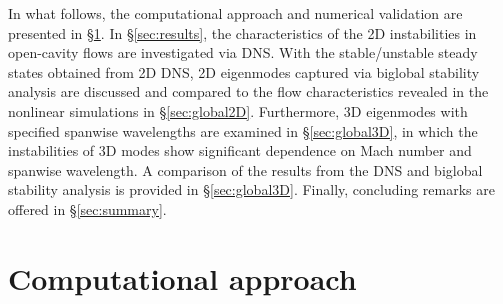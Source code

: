 \documentclass{jfm}
\begin{document}
In what follows, the computational approach and numerical validation are presented in \S{\ref{sec:approach}}. In \S{\ref{sec:results}}, the characteristics of the 2D instabilities in open-cavity flows are investigated via DNS. With the stable/unstable steady states obtained from 2D DNS, 2D eigenmodes captured via biglobal stability analysis are discussed and compared to the flow characteristics revealed in the nonlinear simulations in \S{\ref{sec:global2D}}. Furthermore, 3D eigenmodes with specified spanwise wavelengths are examined in \S{\ref{sec:global3D}}, in which the instabilities of 3D modes show significant dependence on Mach number and spanwise wavelength. A comparison of the results from the DNS and biglobal stability analysis is provided in \S{\ref{sec:global3D}}. Finally, concluding remarks are offered in \S{\ref{sec:summary}}.

\section{Computational approach}\label{sec:approach}
\end{document}
